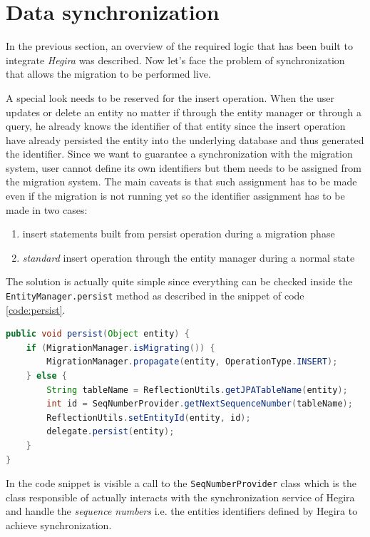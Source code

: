 \section{Data synchronization}
\label{sec:synch}
In the previous section, an overview of the required logic that has been built to integrate \textit{Hegira} was described. Now let's face the problem of synchronization that allows the migration to be performed live.

\noindent A special look needs to be reserved for the insert operation. When the user updates or delete an entity no matter if through the entity manager or through a query, he already knows the identifier of that entity since the insert operation have already persisted the entity into the underlying database and thus generated the identifier.
Since we want to guarantee a synchronization with the migration system, user cannot define its own identifiers but them needs to be assigned from the migration system.
The main caveats is that such assignment has to be made even if the migration is not running yet so the identifier assignment has to be made in two cases:
\begin{enumerate}
\item insert statements built from persist operation during a migration phase
\item \textit{standard} insert operation through the entity manager during a normal state
\end{enumerate}

\noindent The solution is actually quite simple since everything can be checked inside the \texttt{EntityManager.persist} method as described in the snippet of code \ref{code:persist}.

\begin{lstlisting}[language=Java, caption=Persist operation, label=code:persist]
public void persist(Object entity) {
    if (MigrationManager.isMigrating()) {
        MigrationManager.propagate(entity, OperationType.INSERT);
    } else {
        String tableName = ReflectionUtils.getJPATableName(entity);
        int id = SeqNumberProvider.getNextSequenceNumber(tableName);
        ReflectionUtils.setEntityId(entity, id);
        delegate.persist(entity);
    }
}
\end{lstlisting}

\noindent In the code snippet is visible a call to the  \texttt{SeqNumberProvider} class which is the class responsible of actually interacts with the synchronization service of Hegira and handle the \textit{sequence numbers} i.e. the entities identifiers defined by Hegira to achieve synchronization. 

